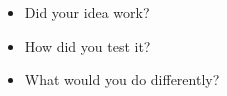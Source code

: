 \begin{itemize}
    \item Did your idea work?
    \item How did you test it?
    \item What would you do differently?
\end{itemize}
